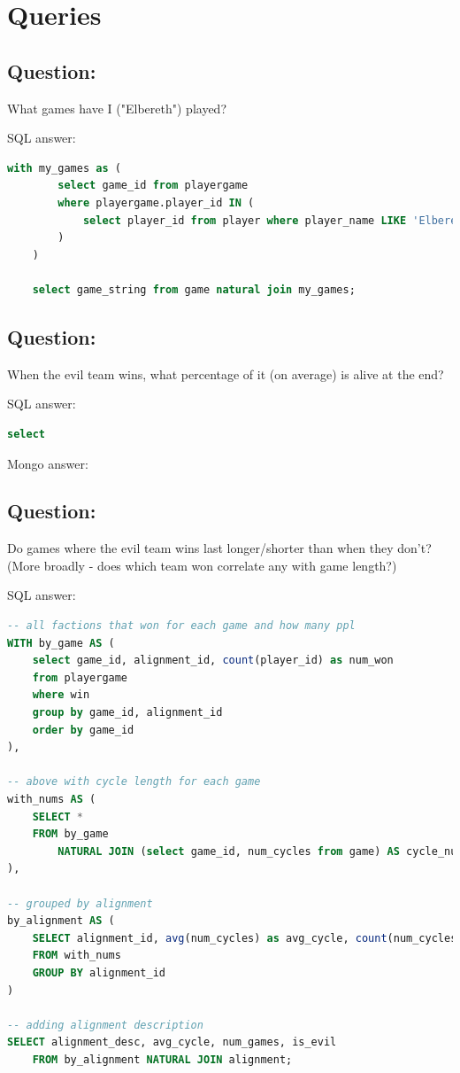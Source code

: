 \documentclass[11pt, oneside]{amsart}   	%
\begin{document}
\section{Queries}

\subsection{Question:} What games have I ("Elbereth") played? 

SQL answer: 
\begin{lstlisting}[language=SQL]
    with my_games as (
        select game_id from playergame 
        where playergame.player_id IN (
            select player_id from player where player_name LIKE 'Elbereth'
        )
    )
        
    select game_string from game natural join my_games;
\end{lstlisting}
    



\subsection{Question:} When the evil team wins, what percentage of it (on average) is alive at the end? 

SQL answer:
\begin{lstlisting}[language=SQL]
select
\end{lstlisting}

Mongo answer:


\subsection{Question:} Do games where the evil team wins last longer/shorter than when they don't? (More broadly - does which team won correlate any with game length?)

SQL answer:
\begin{lstlisting}[language=SQL]
-- all factions that won for each game and how many ppl 
WITH by_game AS (
    select game_id, alignment_id, count(player_id) as num_won
    from playergame
    where win
    group by game_id, alignment_id
    order by game_id
),

-- above with cycle length for each game
with_nums AS (
    SELECT * 
    FROM by_game 
        NATURAL JOIN (select game_id, num_cycles from game) AS cycle_nums
), 

-- grouped by alignment
by_alignment AS (
    SELECT alignment_id, avg(num_cycles) as avg_cycle, count(num_cycles) as num_games
    FROM with_nums 
    GROUP BY alignment_id
)

-- adding alignment description
SELECT alignment_desc, avg_cycle, num_games, is_evil 
    FROM by_alignment NATURAL JOIN alignment;
\end{lstlisting}
\end{document}
